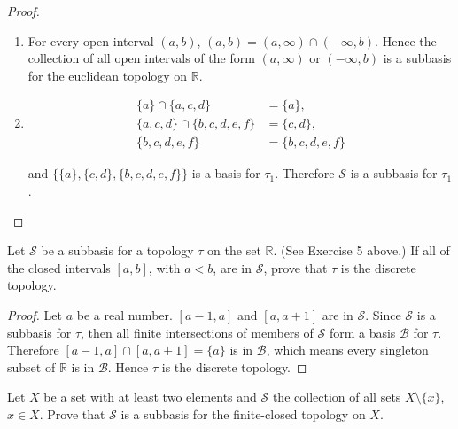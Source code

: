 \begin{proof}
	\begin{enumerate}[label={(\roman*)}]
		\item For every open interval $(a, b)$, $(a, b) = (a, \infty)\cap (-\infty, b)$. Hence the collection of all open intervals of the form $(a, \infty)$ or $(-\infty, b)$ is a subbasis for the euclidean topology on $\mathbb{R}$.
		\item \begin{align*}
			      \{ a \} \cap \{ a, c, d \}             & = \{ a \},            \\
			      \{ a, c, d \} \cap \{ b, c, d, e, f \} & = \{ c, d \},         \\
			      \{ b, c, d, e, f \}                    & = \{ b, c, d, e, f \}
		      \end{align*}

		      and $\{ \{ a \}, \{ c, d \}, \{ b, c, d, e, f \} \}$ is a basis for $\tau_{1}$. Therefore $\mathcal{S}$ is a subbasis for $\tau_{1}$.
	\end{enumerate}
\end{proof}
\newpage

\begin{exercise}
	Let $\mathcal{S}$ be a subbasis for a topology $\tau$ on the set $\mathbb{R}$. (See Exercise 5 above.) If all of the closed intervals $[a, b]$, with $a < b$, are in $\mathcal{S}$, prove that $\tau$ is the discrete topology.
\end{exercise}

\begin{proof}
	Let $a$ be a real number. $[a-1, a]$ and $[a, a+1]$ are in $\mathcal{S}$. Since $\mathcal{S}$ is a subbasis for $\tau$, then all finite intersections of members of $\mathcal{S}$ form a basis $\mathcal{B}$ for $\tau$. Therefore $[a-1, a]\cap [a, a+1] = \{ a \}$ is in $\mathcal{B}$, which means every singleton subset of $\mathbb{R}$ is in $\mathcal{B}$. Hence $\tau$ is the discrete topology.
\end{proof}
\newpage

\begin{exercise}
	Let $X$ be a set with at least two elements and $\mathcal{S}$ the collection of all sets $X\setminus \{x\}$, $x\in X$. Prove that $\mathcal{S}$ is a subbasis for the finite-closed topology on $X$.
\end{exercise}

